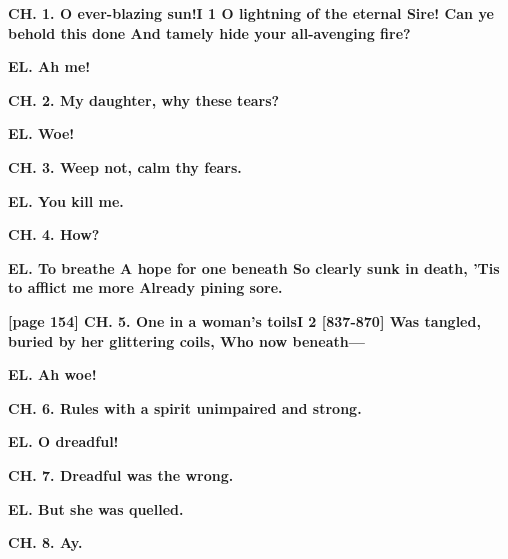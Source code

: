 \documentclass[11pt,letter]{book}
\begin{document}
\par \textbf{CH. 1. O ever-blazing sun!I 1 O lightning of the eternal Sire! Can ye behold this done And tamely hide your all-avenging fire?}
\par 

\par \textbf{EL. Ah me!}
\par 

\par \textbf{CH. 2. My daughter, why these tears?}
\par 

\par \textbf{EL. Woe!}
\par 

\par \textbf{CH. 3. Weep not, calm thy fears.}
\par 

\par \textbf{EL. You kill me.}
\par 

\par \textbf{CH. 4. How?}
\par 

\par \textbf{EL. To breathe A hope for one beneath So clearly sunk in death, ’Tis to afflict me more Already pining sore.}
\par 

\par \textbf{[page 154] CH. 5. One in a woman’s toilsI 2 [837-870] Was tangled, buried by her glittering coils, Who now beneath—}
\par 

\par \textbf{EL. Ah woe!}
\par 

\par \textbf{CH. 6. Rules with a spirit unimpaired and strong.}
\par 

\par \textbf{EL. O dreadful!}
\par 

\par \textbf{CH. 7. Dreadful was the wrong.}
\par 

\par \textbf{EL. But she was quelled.}
\par 

\par \textbf{CH. 8. Ay.}
\par 
\end{document}
